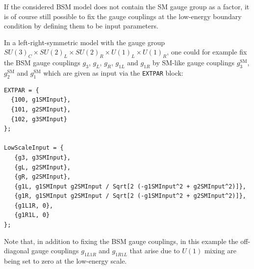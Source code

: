 \documentclass[final,3p,11pt,pdflatex]{elsarticle}
\newcommand{\code}[1]{\lstinline|#1|}  %
\newcommand{\SM}{\ensuremath{\text{SM}}\xspace}
\begin{document}
%
If the considered BSM model does not contain the SM gauge
group as a factor, it is of course still possible to fix the gauge
couplings at the low-energy boundary condition by defining them to be
input parameters.
%
\begin{example}
  In a left-right-symmetric model with the gauge group $SU(3)_C\times
  SU(2)_L\times SU(2)_R\times U(1)_L\times U(1)_R$, one could for
  example fix the BSM gauge couplings $g_3$, $g_L$, $g_R$, $g_{1L}$
  and $g_{1R}$ by SM-like gauge couplings $g_3^\SM$,
  $g_2^\SM$ and $g_1^\SM$ which are given as input via the
  \code{EXTPAR} block:
%
\begin{lstlisting}
EXTPAR = {
  {100, g1SMInput},
  {101, g2SMInput},
  {102, g3SMInput}
};

LowScaleInput = {
   {g3, g3SMInput},
   {gL, g2SMInput},
   {gR, g2SMInput},
   {g1L, g1SMInput g2SMInput / Sqrt[2 (-g1SMInput^2 + g2SMInput^2)]},
   {g1R, g1SMInput g2SMInput / Sqrt[2 (-g1SMInput^2 + g2SMInput^2)]},
   {g1L1R, 0},
   {g1R1L, 0}
};
\end{lstlisting}
Note that, in addition to fixing the BSM gauge couplings, in this example
the off-diagonal gauge couplings $g_{1L1R}$ and $g_{1R1L}$ that arise due to
$U(1)$ mixing are being set to zero at the low-energy scale.
\end{example}
\end{document}
